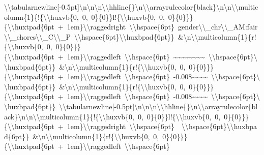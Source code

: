 \documentclass[
  english,
  man]{apa6}
\begin{document}
\textbackslash{}\textbackslash{}tabularnewline{[}-0.5pt{]}\textbackslash{}n\textbackslash{}n\textbackslash{}n\textbackslash{}\textbackslash{}hhline\{\}\textbackslash{}n\textbackslash{}\textbackslash{}arrayrulecolor\{black\}\textbackslash{}n\textbackslash{}n\textbackslash{}\textbackslash{}multicolumn\{1\}\{!\{\textbackslash{}\textbackslash{}huxvb\{0,\ 0,\ 0\}\{0\}\}l!\{\textbackslash{}\textbackslash{}huxvb\{0,\ 0,\ 0\}\{0\}\}\}\{\textbackslash{}\textbackslash{}huxtpad\{6pt\ +\ 1em\}\textbackslash{}\textbackslash{}raggedright\ \textbackslash{}\textbackslash{}hspace\{6pt\}\ gender\textbackslash{}\textbackslash{}\_chr\textbackslash{}\textbackslash{}\_AM:fair\textbackslash{}\textbackslash{}\_chores\textbackslash{}\textbackslash{}\_C\textbackslash{}\textbackslash{}\_P\ \textbackslash{}\textbackslash{}hspace\{6pt\}\textbackslash{}\textbackslash{}huxbpad\{6pt\}\}\ \&\textbackslash{}n\textbackslash{}\textbackslash{}multicolumn\{1\}\{r!\{\textbackslash{}\textbackslash{}huxvb\{0,\ 0,\ 0\}\{0\}\}\}\{\textbackslash{}\textbackslash{}huxtpad\{6pt\ +\ 1em\}\textbackslash{}\textbackslash{}raggedleft\ \textbackslash{}\textbackslash{}hspace\{6pt\}\ \textasciitilde{}\textasciitilde{}\textasciitilde{}\textasciitilde{}\textasciitilde{}\textasciitilde{}\textasciitilde{}\textasciitilde{}\ \textbackslash{}\textbackslash{}hspace\{6pt\}\textbackslash{}\textbackslash{}huxbpad\{6pt\}\}\ \&\textbackslash{}n\textbackslash{}\textbackslash{}multicolumn\{1\}\{r!\{\textbackslash{}\textbackslash{}huxvb\{0,\ 0,\ 0\}\{0\}\}\}\{\textbackslash{}\textbackslash{}huxtpad\{6pt\ +\ 1em\}\textbackslash{}\textbackslash{}raggedleft\ \textbackslash{}\textbackslash{}hspace\{6pt\}\ -0.008\textasciitilde{}\textasciitilde{}\textasciitilde{}\textasciitilde{}\ \textbackslash{}\textbackslash{}hspace\{6pt\}\textbackslash{}\textbackslash{}huxbpad\{6pt\}\}\ \&\textbackslash{}n\textbackslash{}\textbackslash{}multicolumn\{1\}\{r!\{\textbackslash{}\textbackslash{}huxvb\{0,\ 0,\ 0\}\{0\}\}\}\{\textbackslash{}\textbackslash{}huxtpad\{6pt\ +\ 1em\}\textbackslash{}\textbackslash{}raggedleft\ \textbackslash{}\textbackslash{}hspace\{6pt\}\ -0.008\textasciitilde{}\textasciitilde{}\textasciitilde{}\textasciitilde{}\ \textbackslash{}\textbackslash{}hspace\{6pt\}\textbackslash{}\textbackslash{}huxbpad\{6pt\}\}\ \textbackslash{}\textbackslash{}tabularnewline{[}-0.5pt{]}\textbackslash{}n\textbackslash{}n\textbackslash{}n\textbackslash{}\textbackslash{}hhline\{\}\textbackslash{}n\textbackslash{}\textbackslash{}arrayrulecolor\{black\}\textbackslash{}n\textbackslash{}n\textbackslash{}\textbackslash{}multicolumn\{1\}\{!\{\textbackslash{}\textbackslash{}huxvb\{0,\ 0,\ 0\}\{0\}\}l!\{\textbackslash{}\textbackslash{}huxvb\{0,\ 0,\ 0\}\{0\}\}\}\{\textbackslash{}\textbackslash{}huxtpad\{6pt\ +\ 1em\}\textbackslash{}\textbackslash{}raggedright\ \textbackslash{}\textbackslash{}hspace\{6pt\}\ \ \textbackslash{}\textbackslash{}hspace\{6pt\}\textbackslash{}\textbackslash{}huxbpad\{6pt\}\}\ \&\textbackslash{}n\textbackslash{}\textbackslash{}multicolumn\{1\}\{r!\{\textbackslash{}\textbackslash{}huxvb\{0,\ 0,\ 0\}\{0\}\}\}\{\textbackslash{}\textbackslash{}huxtpad\{6pt\ +\ 1em\}\textbackslash{}\textbackslash{}raggedleft\ \textbackslash{}\textbackslash{}hspace\{6pt\}\ 
\end{document}
